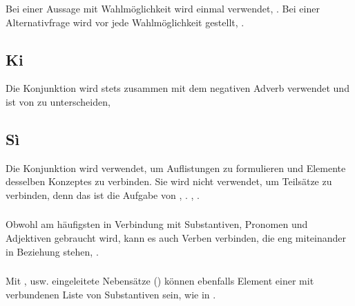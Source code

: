 \subsubsection{} Bei einer Aussage mit Wahlmöglichkeit wird  einmal verwendet,  . Bei einer Alternativfrage wird  vor jede Wahlmöglichkeit gestellt,  .

\subsection{Ki} Die Konjunktion   wird stets zusammen mit dem negativen Adverb  verwendet und ist von   zu unterscheiden,  

\subsection{Sì} Die Konjunktion   wird verwendet, um Auflistungen zu formulieren und Elemente desselben Konzeptes zu verbinden. Sie wird nicht verwendet, um Teilsätze zu verbinden, denn das ist die Aufgabe von , .  ,  .\label{syn:sì}

\subsubsection{} Obwohl  am häufigsten in Verbindung mit Substantiven, Pronomen und Adjektiven gebraucht wird, kann es auch Verben verbinden, die eng miteinander in Beziehung stehen,  .

\subsubsection{} Mit ,  usw. eingeleitete Nebensätze () können ebenfalls Element einer mit  verbundenen Liste von Substantiven sein, wie in  .

